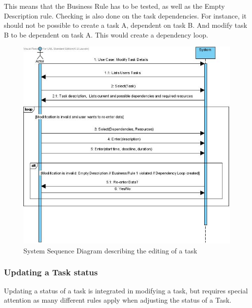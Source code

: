 			This means that the Business Rule has to be tested, as well as the Empty Description rule. Checking is also done on the task dependencies. For instance, it should not be possible to create a task A, dependent on task B. And modify task B to be dependent on task A. This would create a dependency loop.\\
			\begin{figure}[h!]
				\begin{center}
					\includegraphics[scale=0.5]{images/ssd_modify_task.jpg}
				\end{center}
				\caption{System Sequence Diagram describing the editing of a task}
			\end{figure}
			 \subsubsection{Updating a Task status}
			Updating a status of a task is integrated in modifying a task, but requires special attention as many different rules apply when adjusting the status of a Task.

